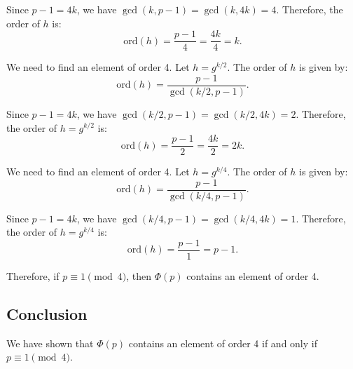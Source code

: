 \documentclass[12pt]{amsart}
\theoremstyle{definition}
\numberwithin{equation}{section}
\begin{document}
\begin{exercise}{8}
    Since \(p-1 = 4k\), we have \(\gcd(k, p-1) = \gcd(k, 4k) = 4\). Therefore, the order of \(h\) is:
    \[
    \text{ord}(h) = \frac{p-1}{4} = \frac{4k}{4} = k.
    \]
    
    We need to find an element of order 4. Let \(h = g^{k/2}\). The order of \(h\) is given by:
    \[
    \text{ord}(h) = \frac{p-1}{\gcd(k/2, p-1)}.
    \]
    
    Since \(p-1 = 4k\), we have \(\gcd(k/2, p-1) = \gcd(k/2, 4k) = 2\). Therefore, the order of \(h = g^{k/2}\) is:
    \[
    \text{ord}(h) = \frac{p-1}{2} = \frac{4k}{2} = 2k.
    \]
    
    We need to find an element of order 4. Let \(h = g^{k/4}\). The order of \(h\) is given by:
    \[
    \text{ord}(h) = \frac{p-1}{\gcd(k/4, p-1)}.
    \]
    
    Since \(p-1 = 4k\), we have \(\gcd(k/4, p-1) = \gcd(k/4, 4k) = 1\). Therefore, the order of \(h = g^{k/4}\) is:
    \[
    \text{ord}(h) = \frac{p-1}{1} = p-1.
    \]
    
    Therefore, if \(p \equiv 1 \pmod 4\), then \(\Phi(p)\) contains an element of order 4.
    
    \subsection*{Conclusion}
    
    We have shown that \(\Phi(p)\) contains an element of order 4 if and only if \(p \equiv 1 \pmod 4\).
    
\end{exercise}
\newpage
\end{document}

